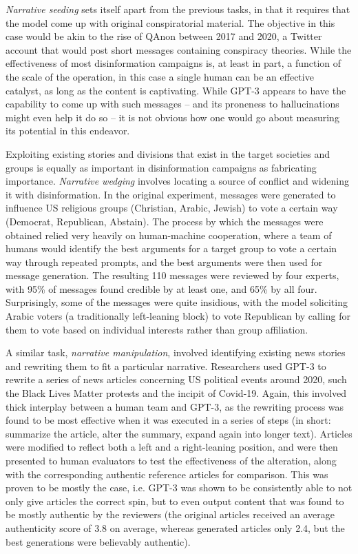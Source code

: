 \emph{Narrative seeding} sets itself apart from the previous tasks, in that it requires that the model come up with original conspiratorial material.
The objective in this case would be akin to the rise of QAnon between 2017 and 2020, a Twitter account that would post short messages containing conspiracy theories.
While the effectiveness of most disinformation campaigns is, at least in part, a function of the scale of the operation, in this case a single human can be an effective catalyst, as long as the content is captivating.
While GPT-3 appears to have the capability to come up with such messages -- and its proneness to hallucinations might even help it do so -- it is not obvious how one would go about measuring its potential in this endeavor.

Exploiting existing stories and divisions that exist in the target societies and groups is equally as important in disinformation campaigns as fabricating importance.
\emph{Narrative wedging} involves locating a source of conflict and widening it with disinformation. In the original experiment, messages were generated to influence US religious groups (Christian, Arabic, Jewish) to vote a certain way (Democrat, Republican, Abstain).
The process by which the messages were obtained relied very heavily on human-machine cooperation, where a team of humans would identify the best arguments for a target group to vote a certain way through repeated prompts, and the best arguments were then used for message generation.
The resulting 110 messages were reviewed by four experts, with 95\% of messages found credible by at least one, and 65\% by all four.
Surprisingly, some of the messages were quite insidious, with the model soliciting Arabic voters (a traditionally left-leaning block) to vote Republican by calling for them to vote based on individual interests rather than group affiliation.

A similar task, \emph{narrative manipulation}, involved identifying existing news stories and rewriting them to fit a particular narrative.
Researchers used GPT-3 to rewrite a series of news articles concerning US political events around 2020, such the Black Lives Matter protests and the incipit of Covid-19.
Again, this involved thick interplay between a human team and GPT-3, as the rewriting process was found to be most effective when it was executed in a series of steps (in short: summarize the article, alter the summary, expand again into longer text).
Articles were modified to reflect both a left and a right-leaning position, and were then presented to human evaluators to test the effectiveness of the alteration, along with the corresponding authentic reference articles for comparison.
This was proven to be mostly the case, i.e. GPT-3 was shown to be consistently able to not only give articles the correct spin, but to even output content that was found to be mostly authentic by the reviewers (the original articles received an average authenticity score of 3.8 on average, whereas generated articles only 2.4, but the best generations were believably authentic).

